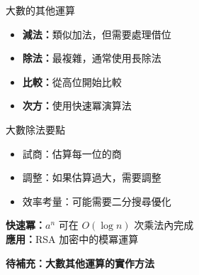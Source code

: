 \documentclass{beamer}
\begin{document}
\begin{frame}{大數的其他運算}
\begin{itemize}
    \item \textbf{減法：}類似加法，但需要處理借位
    \item \textbf{除法：}最複雜，通常使用長除法
    \item \textbf{比較：}從高位開始比較
    \item \textbf{次方：}使用快速冪演算法
\end{itemize}

\vspace{1em}
\begin{block}{大數除法要點}
\begin{itemize}
    \item 試商：估算每一位的商
    \item 調整：如果估算過大，需要調整
    \item 效率考量：可能需要二分搜尋優化
\end{itemize}
\end{block}

\vspace{1em}
\textbf{快速冪：}$a^n$ 可在 $O(\log n)$ 次乘法內完成\\
\textbf{應用：}RSA 加密中的模冪運算

\vspace{1em}
\textbf{待補充：大數其他運算的實作方法}
\end{frame}
\end{document}
